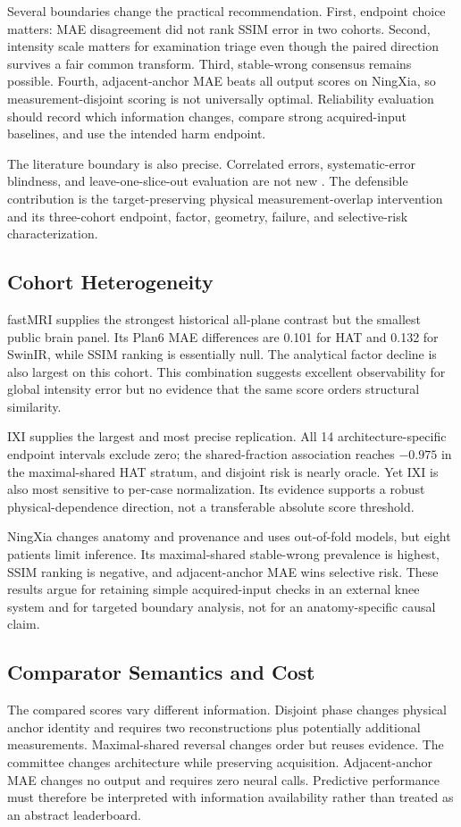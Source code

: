 \documentclass[journal,10pt]{IEEEtran}
\begin{document}
Several boundaries change the practical recommendation. First, endpoint choice matters: MAE disagreement did not rank SSIM error in two cohorts. Second, intensity scale matters for examination triage even though the paired direction survives a fair common transform. Third, stable-wrong consensus remains possible. Fourth, adjacent-anchor MAE beats all output scores on NingXia, so measurement-disjoint scoring is not universally optimal. Reliability evaluation should record which information changes, compare strong acquired-input baselines, and use the intended harm endpoint.

The literature boundary is also precise. Correlated errors, systematic-error blindness, and leave-one-slice-out evaluation are not new \cite{brown2005diversity,hu2021predict,horvath2017highorder}. The defensible contribution is the target-preserving physical measurement-overlap intervention and its three-cohort endpoint, factor, geometry, failure, and selective-risk characterization.

\subsection{Cohort Heterogeneity}
fastMRI supplies the strongest historical all-plane contrast but the smallest public brain panel. Its Plan6 MAE differences are 0.101 for HAT and 0.132 for SwinIR, while SSIM ranking is essentially null. The analytical factor decline is also largest on this cohort. This combination suggests excellent observability for global intensity error but no evidence that the same score orders structural similarity.

IXI supplies the largest and most precise replication. All 14 architecture-specific endpoint intervals exclude zero; the shared-fraction association reaches $-0.975$ in the maximal-shared HAT stratum, and disjoint risk is nearly oracle. Yet IXI is also most sensitive to per-case normalization. Its evidence supports a robust physical-dependence direction, not a transferable absolute score threshold.

NingXia changes anatomy and provenance and uses out-of-fold models, but eight patients limit inference. Its maximal-shared stable-wrong prevalence is highest, SSIM ranking is negative, and adjacent-anchor MAE wins selective risk. These results argue for retaining simple acquired-input checks in an external knee system and for targeted boundary analysis, not for an anatomy-specific causal claim.

\subsection{Comparator Semantics and Cost}
The compared scores vary different information. Disjoint phase changes physical anchor identity and requires two reconstructions plus potentially additional measurements. Maximal-shared reversal changes order but reuses evidence. The committee changes architecture while preserving acquisition. Adjacent-anchor MAE changes no output and requires zero neural calls. Predictive performance must therefore be interpreted with information availability rather than treated as an abstract leaderboard.
\end{document}
